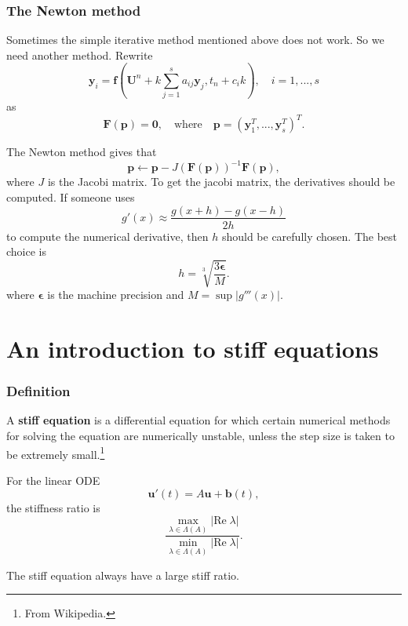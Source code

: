 \documentclass[9pt]{beamer}
\begin{document}
\begin{frame}
  \frametitle{The Newton method}
  Sometimes the simple iterative method mentioned above does not work. So we need another method. Rewrite
  \begin{equation*}
    \mathbf{y}_i=\mathbf{f}\left(\mathbf{U}^n+k\sum_{j=1}^s a_{ij} \mathbf{y}_j,t_n+c_ik\right),\quad i=1,...,s
  \end{equation*}
  as
  \begin{equation*}
    \mathbf{F}(\mathbf{p})=\mathbf{0}, \quad \text{where} \quad \mathbf{p}=(\mathbf{y}_1^T,...,\mathbf{y}_s^T)^T.
  \end{equation*}

  The Newton method gives that
  \begin{equation*}
    \mathbf{p}\gets \mathbf{p}-J(\mathbf{F}(\mathbf{p}))^{-1}\mathbf{F}(\mathbf{p}),
  \end{equation*}
  where $J$ is the Jacobi matrix. To get the jacobi matrix, the derivatives should be computed. If someone uses
  \begin{equation*}
    g'(x)\approx \frac{g(x+h)-g(x-h)}{2h}
  \end{equation*}
  to compute the numerical derivative, then $h$ should be carefully chosen. The best choice is
  \begin{equation*}
    h=\sqrt[3]{\frac{3\mathbf{\epsilon}}{M}}.
  \end{equation*}
  where $\mathbf{\epsilon}$ is the machine precision and $M=\sup |g'''(x)|$.
\end{frame}

\section{An introduction to stiff equations}

\begin{frame}
  \frametitle{Definition}
  A \textbf{stiff equation} is a differential equation for which certain numerical methods for solving the equation are numerically unstable, unless the step size is taken to be extremely small.\footnote{From Wikipedia.}

  For the linear ODE
  \begin{equation*}
    \mathbf{u'}(t)=A\mathbf{u}+\mathbf{b}(t),
  \end{equation*}
  the stiffness ratio is
  \begin{equation*}
    \frac{\max\limits_{\lambda\in\Lambda(A)}|\text{Re}\;\lambda|}{\min\limits_{\lambda\in\Lambda(A)}|\text{Re}\;\lambda|}.
  \end{equation*}

  The stiff equation always have a large stiff ratio.
\end{frame}
\end{document}
